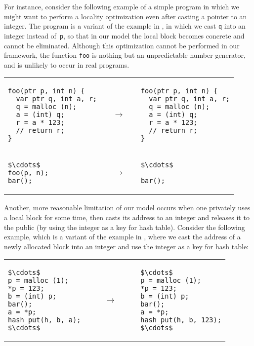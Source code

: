 For instance, consider the following example of a simple program in which we might want to perform a locality optimization even after casting a pointer to an integer.
The program is a variant of 
the example in , in which we cast \texttt{q} into an integer instead of~\texttt{p},
so that in our model the local block becomes concrete and cannot be eliminated.
Although this optimization cannot be performed in our framework, the function \texttt{foo} is nothing but an %
unpredictable number generator, and is unlikely to occur in real programs.

\begin{center}
\begin{tabular}{@{}l@{}l@{}l@{}}
\begin{lstlisting}
foo(ptr p, int n) {
  var ptr q, int a, r;
  q = malloc (n);
  a = (int) q;
  r = a * 123;
  // return r;
}
\end{lstlisting}
&
$\quad\rightarrow\quad$
&
\begin{lstlisting}
foo(ptr p, int n) {
  var ptr q, int a, r;
  q = malloc (n);
  a = (int) q;
  r = a * 123;
  // return r;
}
\end{lstlisting}
\\
\begin{lstlisting}
$\cdots$
foo(p, n);
bar();
\end{lstlisting}
&
$\quad\rightarrow\quad$
&
\begin{lstlisting}
$\cdots$

bar();
\end{lstlisting}
\end{tabular}
\end{center}

Another, more reasonable limitation of our model occurs when one privately uses a local block for some time, then casts its address to an integer and releases it to the
public (\eg by using the integer as a key for hash table).  Consider the following example, which is a variant of the example in ,
where we cast the address of a newly allocated block into an integer
and use the integer as a key for hash table:
\begin{center}
\begin{tabular}{@{}l@{}l@{}l@{}}
\begin{lstlisting}
$\cdots$
p = malloc (1);
*p = 123;
b = (int) p;
bar();
a = *p;
hash_put(h, b, a);
$\cdots$
\end{lstlisting}
&
$\qquad\rightarrow\qquad$
&
\begin{lstlisting}
$\cdots$
p = malloc (1);
*p = 123;
b = (int) p;
bar();
a = *p;
hash_put(h, b, 123);
$\cdots$
\end{lstlisting}
\end{tabular}
\end{center}

